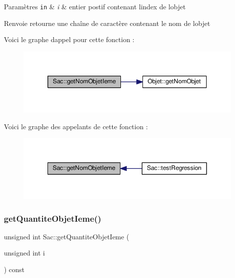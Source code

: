 \begin{DoxyParams}[1]{Paramètres}
\mbox{\tt in}  & {\em i} & entier postif contenant l\textquotesingle{}index de l\textquotesingle{}objet \\
\hline
\end{DoxyParams}
\begin{DoxyReturn}{Renvoie}
retourne une chaîne de caractère contenant le nom de l\textquotesingle{}objet 
\end{DoxyReturn}
Voici le graphe d\textquotesingle{}appel pour cette fonction \+:\nopagebreak
\begin{figure}[H]
\begin{center}
\leavevmode
\includegraphics[width=339pt]{class_sac_ad8d86e7c53ae92e33c8eb89ca5033b55_cgraph}
\end{center}
\end{figure}
Voici le graphe des appelants de cette fonction \+:\nopagebreak
\begin{figure}[H]
\begin{center}
\leavevmode
\includegraphics[width=341pt]{class_sac_ad8d86e7c53ae92e33c8eb89ca5033b55_icgraph}
\end{center}
\end{figure}
\mbox{\label{class_sac_a09dbee93f5c31ed563d87171de923d8c}} 
\subsubsection{\texorpdfstring{get\+Quantite\+Objet\+Ieme()}{getQuantiteObjetIeme()}}
{\footnotesize\ttfamily unsigned int Sac\+::get\+Quantite\+Objet\+Ieme (\begin{DoxyParamCaption}\item[{unsigned int}]{i }\end{DoxyParamCaption}) const}



